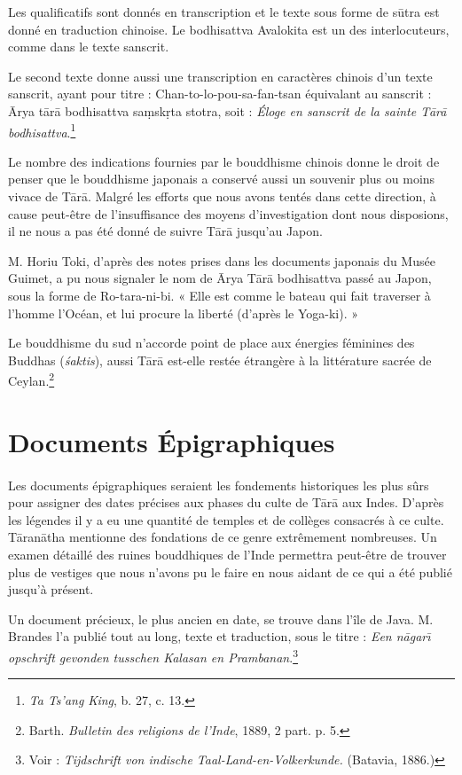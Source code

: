\documentclass[a4paper, 11pt, oneside, french, landscape, twocolumn]{article}
\begin{document}
Les qualificatifs sont donnés en transcription et le texte sous forme de s\={u}tra est donné en traduction chinoise. Le bodhisattva Avalokita est un des interlocuteurs, comme dans le texte sanscrit.

Le second texte donne aussi une transcription en caractères chinois d'un texte sanscrit, ayant pour titre : Chan-to-lo-pou-sa-fan-tsan équivalant au sanscrit : \={A}rya t\={a}r\={a} bodhisattva sa\d{m}sk\d{r}ta stotra, soit : \emph{Éloge en sanscrit de la sainte T\={a}r\={a} bodhisattva}.\footnote{\emph{Ta Ts'ang King}, b. 27, c. 13.}

Le nombre des indications fournies par le bouddhisme chinois donne le droit de penser que le bouddhisme japonais a conservé aussi un souvenir plus ou moins vivace de T\={a}r\={a}. Malgré les efforts que nous avons tentés dans cette direction, à cause peut-être de l'insuffisance des moyens d'investigation dont nous disposions, il ne nous a pas été donné de suivre T\={a}r\={a} jusqu'au Japon.

M. Horiu Toki, d'après des notes prises dans les documents japonais du Musée Guimet, a pu nous signaler le nom de \={A}rya T\={a}r\={a} bodhisattva passé au Japon, sous la forme de Ro-tara-ni-bi. « Elle est comme le bateau qui fait traverser à l'homme l'Océan, et lui procure la liberté (d'après le Yoga-ki). »

Le bouddhisme du sud n'accorde point de place aux énergies féminines des Buddhas (\emph{\'{s}aktis}), aussi T\={a}r\={a} est-elle restée étrangère à la littérature sacrée de Ceylan.\footnote{Barth. \emph{Bulletin des religions de l'Inde}, 1889, 2 part. p. 5.}
\clearpage
\section{Documents Épigraphiques}
\paragraph{}
Les documents épigraphiques seraient les fondements historiques les plus sûrs pour assigner des dates précises aux phases du culte de T\={a}r\={a} aux Indes. D'après les légendes il y a eu une quantité de temples et de collèges consacrés à ce culte. T\={a}ran\={a}tha mentionne des fondations de ce genre extrêmement nombreuses. Un examen détaillé des ruines bouddhiques de l'Inde permettra peut-être de trouver plus de vestiges que nous n'avons pu le faire en nous aidant de ce qui a été publié jusqu'à présent.

Un document précieux, le plus ancien en date, se trouve dans l'île de Java. M. Brandes l'a publié tout au long, texte et traduction, sous le titre : \emph{Een n\={a}gar\={\i} opschrift gevonden tusschen Kalasan en Prambanan}.\footnote{Voir : \emph{Tijdschrift von indische Taal-Land-en-Volkerkunde.} (Batavia, 1886.)}
\end{document}

